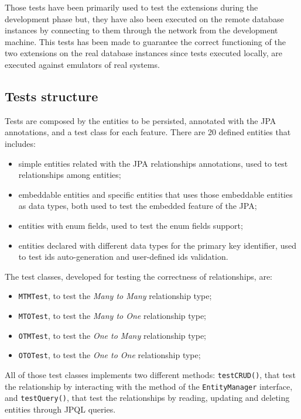 \noindent Those tests have been primarily used to test the extensions during the development phase but, they have also been executed on the remote database instances by connecting to them through the network from the development machine. This tests has been made to guarantee the correct functioning of the two extensions on the real database instances since tests executed locally, are executed against emulators of real systems.

\subsection{Tests structure}
Tests are composed by the entities to be persisted, annotated with the JPA annotations, and a test class for each feature.
There are 20 defined entities that includes:
\begin{itemize}
\item simple entities related with the JPA relationships annotations, used to test relationships among entities;
\item embeddable entities and specific entities that uses those embeddable entities as data types, both used to test the embedded feature of the JPA;
\item entities with enum fields, used to test the enum fields support;
\item entities declared with different data types for the primary key identifier, used to test ids auto-generation and user-defined ids validation.
\end{itemize}

\noindent The test classes, developed for testing the correctness of relationships, are:
\begin{itemize}
\item \texttt{MTMTest}, to test the \textit{Many to Many} relationship type;
\item \texttt{MTOTest}, to test the \textit{Many to One} relationship type;
\item \texttt{OTMTest}, to test the \textit{One to Many} relationship type;
\item \texttt{OTOTest}, to test the \textit{One to One} relationship type;
\end{itemize}
\noindent All of those test classes implements two different methods: \texttt{testCRUD()}, that test the relationship by interacting with the method of the \texttt{EntityManager} interface, and \texttt{testQuery()}, that test the relationships by reading, updating and deleting entities through JPQL queries.

